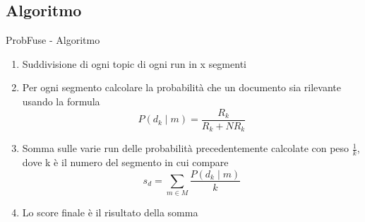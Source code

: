\subsection{Algoritmo}
\begin{frame}{ProbFuse - Algoritmo}
	\begin{enumerate}
		\item Suddivisione di ogni topic di ogni run in x segmenti
		\item Per ogni segmento calcolare la probabilità che un documento sia rilevante usando la formula
			\[P(d_k\mid m)=\frac{R_k}{R_k+NR_k}\]
		\item Somma sulle varie run delle probabilità precedentemente calcolate con peso $\frac{1}{k}$, dove k è il numero del segmento in cui compare
			\[s_d=\sum_{m\in M}\frac{P(d_k\mid m)}{k}\]
		\item Lo score finale è il risultato della somma
	\end{enumerate}
\end{frame}